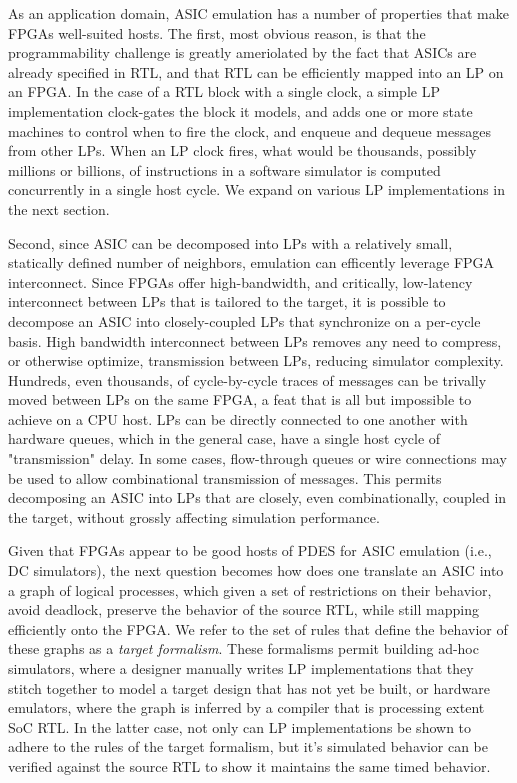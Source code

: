 As an application domain, ASIC emulation has a number of properties that make
FPGAs well-suited hosts. The first, most obvious reason, is that the programmability challenge is
greatly ameriolated by the fact that ASICs are already specified in RTL, and
that RTL can be efficiently mapped into an LP on an FPGA. In the case of a RTL block with a single clock, a
simple LP implementation clock-gates the block it models, and adds one or more state
machines to control when to fire the clock, and enqueue and dequeue messages
from other LPs. When an LP clock fires, what would be thousands, possibly
millions or billions, of instructions in a software simulator is computed
concurrently in a single host cycle. We expand on various LP implementations in
the next section.

Second, since ASIC can be decomposed into LPs with a relatively small,
statically defined number of neighbors, emulation can efficently leverage FPGA
interconnect.  Since FPGAs offer high-bandwidth, and critically, low-latency
interconnect between LPs that is tailored to the target, it is possible to
decompose an ASIC into closely-coupled LPs that synchronize on a per-cycle
basis. High bandwidth interconnect between LPs removes any need to compress, or
otherwise optimize, transmission between LPs, reducing simulator complexity.
Hundreds, even thousands, of cycle-by-cycle traces of messages can be trivally
moved between LPs on the same FPGA, a feat that is all but impossible to
achieve on a CPU host. LPs can be directly connected to one another with
hardware queues, which in the general case, have a single host cycle of
"transmission" delay. In some cases, flow-through queues or wire connections
may be used to allow combinational transmission of messages. This permits
decomposing an ASIC into LPs that are closely, even combinationally, coupled in
the target, without grossly affecting simulation performance.

Given that FPGAs appear to be good hosts of PDES for ASIC emulation (i.e., DC simulators),
the next question becomes how does one translate an ASIC into a graph of
logical processes, which given a set of restrictions on their behavior, avoid
deadlock, preserve the behavior of the source RTL, while still mapping
efficiently onto the FPGA. We refer to the set of rules that define the
behavior of these graphs as a \emph{target formalism}.
These formalisms permit building ad-hoc simulators, where a designer manually
writes LP implementations that they stitch together to model a target design
that has not yet be built, or hardware emulators, where the graph is inferred by a compiler that is processing extent SoC RTL. In
the latter case, not only can LP implementations be shown to adhere to the
rules of the target formalism, but it's simulated behavior can be verified
against the source RTL to show it maintains the same timed behavior.

